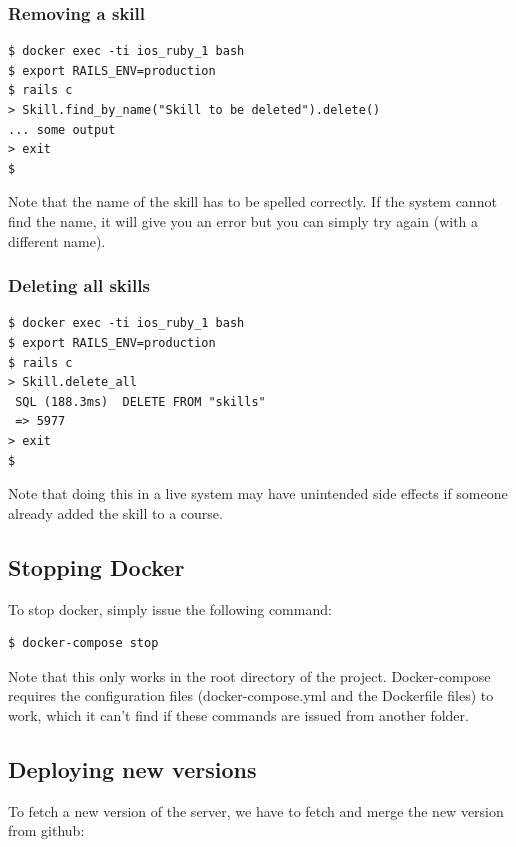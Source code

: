 \subsubsection{Removing a skill}
\begin{verbatim}
$ docker exec -ti ios_ruby_1 bash
$ export RAILS_ENV=production
$ rails c
> Skill.find_by_name("Skill to be deleted").delete()
... some output
> exit
$
\end{verbatim}
Note that the name of the skill has to be spelled correctly. If the system cannot find the name, it will give you an error but you can simply try again (with a different name).

\subsubsection{Deleting all skills}
\begin{verbatim}
$ docker exec -ti ios_ruby_1 bash
$ export RAILS_ENV=production
$ rails c
> Skill.delete_all
 SQL (188.3ms)  DELETE FROM "skills"
 => 5977 
> exit
$
\end{verbatim}
Note that doing this in a live system may have unintended side effects if someone already added the skill to a course.

\subsection{Stopping Docker}
To stop docker, simply issue the following command:

\begin{verbatim}
$ docker-compose stop
\end{verbatim}

Note that this only works in the root directory of the project. Docker-compose requires the configuration files (docker-compose.yml and the Dockerfile files) to work, which it can't find if these commands are issued from another folder.

\subsection{Deploying new versions}
To fetch a new version of the server, we have to fetch and merge the new version from github:

